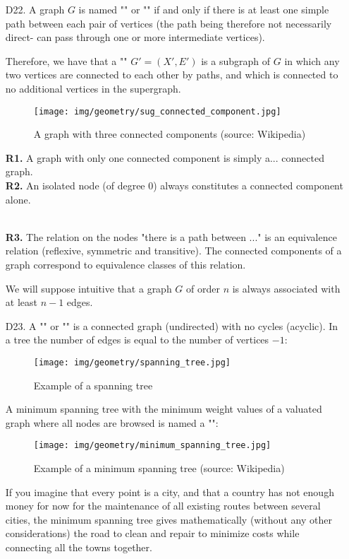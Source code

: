 {\begin{enumerate}
	 \item[D22.] A graph $G$ is named "" or "" if and only if there is at least one simple path between each pair of vertices (the path being therefore not necessarily direct- can pass through one or more intermediate vertices).
	 
	 Therefore, we have that a "" $G'=(X',E')$ is a subgraph of $G$ in which any two vertices are connected to each other by paths, and which is connected to no additional vertices in the supergraph.
	 \begin{figure}[H]
		\centering
		\texttt{[image: img/geometry/sug\_connected\_component.jpg]}
		\caption{A graph with three connected components (source: Wikipedia)}
	\end{figure}
	\begin{tcolorbox}[title=Remarks,colframe=black,arc=10pt]
	\textbf{R1.} A graph with only one connected component is simply a... connected graph. \\
	
	\textbf{R2.} An isolated node (of degree $0$) always constitutes a connected component alone.\\\
	
	\textbf{R3.} The relation on the nodes "there is a path between ..." is an equivalence relation (reflexive, symmetric and transitive). The connected components of a graph correspond to equivalence classes of this relation.
	\end{tcolorbox}
	We will suppose intuitive that a graph $G$ of order $n$ is always associated with at least $n-1$ edges.
	
	\item[D23.] A "" or "" is a connected graph (undirected) with no cycles (acyclic). In a tree the number of edges is equal to the number of vertices $- 1$:
	 \begin{figure}[H]
		\centering
		\texttt{[image: img/geometry/spanning\_tree.jpg]}
		\caption{Example of a spanning tree}
	\end{figure}
	 A minimum spanning tree with the minimum weight values of a valuated graph where all nodes are browsed is named a "":
	 \begin{figure}[H]
		\centering
		\texttt{[image: img/geometry/minimum\_spanning\_tree.jpg]}
		\caption{Example of a minimum spanning tree (source: Wikipedia)}
	\end{figure}
	If you imagine that every point is a city, and that a country has not enough money for now for the maintenance of all existing routes between several cities, the minimum spanning tree gives mathematically (without any other considerations) the road to clean and repair to minimize costs while connecting all the towns together.
	

\end{enumerate}}
